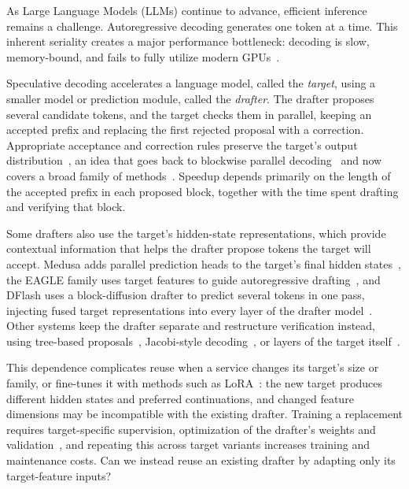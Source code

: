 As Large Language Models (LLMs) continue to advance, efficient inference remains a challenge. Autoregressive decoding generates one token at a time. This inherent seriality creates a major performance bottleneck: decoding is slow, memory-bound, and fails to fully utilize modern GPUs~\citep{cai2024medusa,vaswani2017attention}.

Speculative decoding accelerates a language model, called the \emph{target}, using a smaller model or prediction module, called the \emph{drafter}. The drafter proposes several candidate tokens, and the target checks them in parallel, keeping an accepted prefix and replacing the first rejected proposal with a correction. Appropriate acceptance and correction rules preserve the target's output distribution~\citep{leviathan2023speculative,chen2023sampling}, an idea that goes back to blockwise parallel decoding~\citep{stern2018blockwise} and now covers a broad family of methods~\citep{xia2024survey}. Speedup depends primarily on the length of the accepted prefix in each proposed block, together with the time spent drafting and verifying that block.

Some drafters also use the target's hidden-state representations, which provide contextual information that helps the drafter propose tokens the target will accept. Medusa adds parallel prediction heads to the target's final hidden states~\citep{cai2024medusa}, the EAGLE family uses target features to guide autoregressive drafting~\citep{li2024eagle,li2024eagle2,li2025eagle3}, and DFlash uses a block-diffusion drafter to predict several tokens in one pass, injecting fused target representations into every layer of the drafter model~\citep{chen2026dflash}. Other systems keep the drafter separate and restructure verification instead, using tree-based proposals~\citep{miao2024specinfer,chen2024sequoia}, Jacobi-style decoding~\citep{fu2024lookahead}, or layers of the target itself~\citep{zhang2024draftverify,elhoushi2024layerskip}.

This dependence complicates reuse when a service changes its target's size or family, or fine-tunes it with methods such as LoRA~\citep{hu2022lora}: the new target produces different hidden states and preferred continuations, and changed feature dimensions may be incompatible with the existing drafter. Training a replacement requires target-specific supervision, optimization of the drafter's weights and validation~\citep{li2025eagle3,chen2026dflash}, and repeating this across target variants increases training and maintenance costs. Can we instead reuse an existing drafter by adapting only its target-feature inputs?

